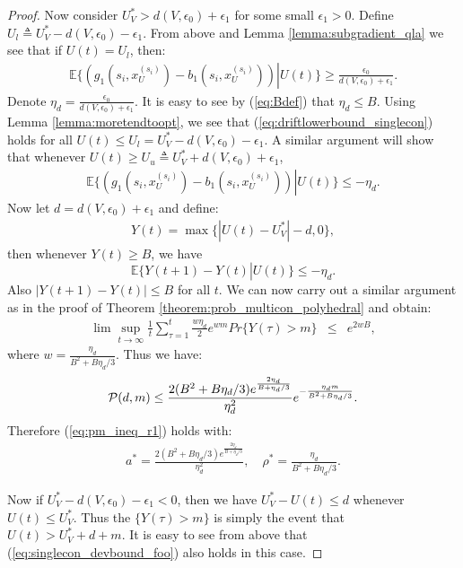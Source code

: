 \documentclass[journal]{IEEEtran}
\newcommand{\prob}{Pr}
\newcommand{\expect}[1]{\mathbb{E}\big\{#1\big\}}
\newcommand{\script}[1]{{{\cal{#1} }}}
\begin{document}
\begin{proof}
Now consider $U^*_V>d(V,\epsilon_0)+\epsilon_1$ for some small $\epsilon_1>0$. Define $U_l\triangleq U^*_V-d(V,\epsilon_0)-\epsilon_1$. From above and Lemma \ref{lemma:subgradient_qla} we see that if $U(t)=U_l$, then:
\begin{eqnarray}
\expect{(g_1(s_i, x^{(s_i)}_{U})-b_1(s_i, x^{(s_i)}_{U}) )\left|\right.U(t)}\geq\frac{\epsilon_0}{d(V,\epsilon_0)+\epsilon_1}.\label{eq:driftlowerbound_singlecon}
\end{eqnarray}
Denote $\eta_d = \frac{\epsilon_0}{d(V,\epsilon_0)+\epsilon_1}$. It is easy to see by (\ref{eq:Bdef}) that $\eta_d\leq B$. Using Lemma \ref{lemma:moretendtoopt}, we see that (\ref{eq:driftlowerbound_singlecon}) holds for all $U(t)\leq U_l= U^*_V-d(V,\epsilon_0)-\epsilon_1$. A similar argument will show that whenever $U(t)\geq U_u\triangleq U^*_V+d(V,\epsilon_0)+\epsilon_1$, 
\begin{eqnarray}
\expect{(g_1(s_i, x^{(s_i)}_{U})-b_1(s_i, x^{(s_i)}_{U}) )\left|\right.U(t)}\leq-\eta_d.\label{eq:driftlowerbound2_singlecon}%
\end{eqnarray}
Now let $d=d(V,\epsilon_0)+\epsilon_1$ and define:
\begin{eqnarray}
Y(t)=\max\{|U(t)-U^*_V|-d, 0\},\label{eq:virtualprocess}
\end{eqnarray}
then whenever $Y(t)\geq B$, we have \[\expect{Y(t+1)-Y(t)\left|\right.U(t)}\leq-\eta_d.\] 
Also $|Y(t+1)-Y(t)|\leq B$ for all $t$. We can now carry out a similar argument as in the proof of Theorem \ref{theorem:prob_multicon_polyhedral} and obtain: 
\begin{eqnarray}
\lim\sup_{t\rightarrow\infty}\frac{1}{t}\sum_{\tau=1}^t\frac{w\eta_d}{2}e^{wm}\prob\{Y(\tau)>m\} &\leq&e^{2wB},
\end{eqnarray}
where $w=\frac{\eta_d}{B^2+B\eta_d/3}$. Thus we have:
\begin{eqnarray}
\script{P}(d, m) \leq \frac{2(B^2+B\eta_d/3)e^{\frac{2\eta_d}{B+\eta_d/3}}}{\eta_d^2} e^{-\frac{\eta_d m}{B^2+B\eta_d/3}}. \label{eq:singlecon_devbound_foo}
\end{eqnarray}
Therefore (\ref{eq:pm_ineq_r1}) holds with: 
\begin{eqnarray}
a^*=\frac{2(B^2+B\eta_d/3)e^{\frac{2\eta_d}{B+\eta_d/3}}}{\eta_d^2},\quad  \rho^*=\frac{\eta_d}{B^2+B\eta_d/3}.\label{eq:pm_ineq_const_r1}
\end{eqnarray}

Now if $U^*_V-d(V,\epsilon_0)-\epsilon_1<0$, then we have $U^*_V-U(t)\leq d$ whenever $U(t)\leq U^*_V$. Thus the $\{Y(\tau)>m\}$ is simply the event that $U(t)>U^*_V+d+m$. It is easy to see from above that (\ref{eq:singlecon_devbound_foo}) also holds in this case. 
\end{proof}
\end{document}
